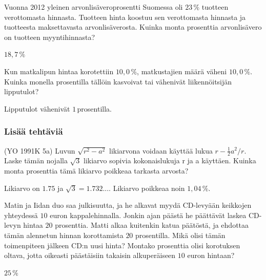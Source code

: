 \begin{tehtavasivu}
\begin{tehtava}
    Vuonna 2012 yleinen arvonlisäveroprosentti Suomessa oli $23\,\%$ tuotteen
    verottomasta hinnasta. Tuotteen hinta koostuu sen verottomasta hinnasta 
    ja tuotteesta maksettavasta arvonlisäverosta. Kuinka monta 
    prosenttia arvonlisävero on tuotteen myyntihinnasta?
    \begin{vastaus}
        $18,7\,\%$
    \end{vastaus}
\end{tehtava}

\begin{tehtava}
    Kun matkalipun hintaa korotettiin $10,0\,\%$, matkustajien määrä väheni $10,0\,\%$.
    Kuinka monella prosentilla tällöin kasvoivat tai vähenivät liikennöitsijän 
    lipputulot?
    \begin{vastaus}
        Lipputulot vähenivät $1$\,prosentilla.
    \end{vastaus}
\end{tehtava}

\subsubsection*{Lisää tehtäviä}

\begin{tehtava}
    (YO 1991K 5a) Luvun $\sqrt{r^2-a^2}$ likiarvona voidaan käyttää lukua $r-{\frac{1}{2}a^2}/r$. Laske tämän nojalla $\sqrt{3}$ likiarvo sopivia kokonaislukuja r ja a käyttäen. Kuinka monta prosenttia tämä likiarvo poikkeaa tarkasta arvosta?
    \begin{vastaus}
        Likiarvo on $1.75$ ja $\sqrt{3}=1.732...$. Likiarvo poikkeaa noin $1,04\,\%$.
    \end{vastaus}
\end{tehtava}

\begin{tehtava}
    Matin ja Iidan duo saa julkisuutta, ja he alkavat myydä CD-levyään keikkojen yhteydessä $10$ euron
    kappalehinnalla. Jonkin ajan päästä he päättävät laskea CD-levyn hintaa $20$ prosenttia. Matti alkaa
    kuitenkin katua päätöstä, ja ehdottaa tämän alennetun hinnan korottamista $20$ prosentilla. Mikä olisi
    tämän toimenpiteen jälkeen CD:n uusi hinta? Montako prosenttia olisi korotuksen oltava, jotta oikeasti
    päästäisiin takaisin alkuperäiseen $10$ euron hintaan?
    \begin{vastaus}
        $25\,\%$
    \end{vastaus}
\end{tehtava}



\end{tehtavasivu}

